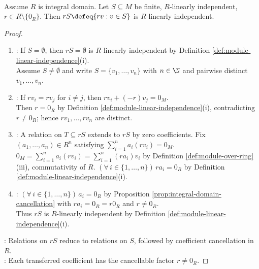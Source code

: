 \begin{proposition} \label{prop:integral-domain-scaling-preserves-independence} \\
Assume $R$ is integral domain. Let $S\subseteq M$ be finite, $R$-linearly independent,  $r\in R\setminus\{0_R\}$. Then $rS\defeq\{rv:v\in S\}$ is $R$-linearly independent.
\begin{proof}
\begin{enumerate}[label=(\roman*)]
\setlength{\itemsep}{0pt}
\item {}: If $S=\emptyset$, then $rS=\emptyset$ is $R$-linearly independent by Definition \ref{def:module-linear-independence}(i).\\
Assume $S\neq\emptyset$ and write $S=\{v_1,\ldots,v_n\}$ with $n\in\N$ and pairwise distinct $v_1,\ldots,v_n$.
\item {}: If $rv_i=rv_j$ for $i\neq j$, then $rv_i+(-r)v_j=0_M$.\\
Then $r=0_R$ by Definition \ref{def:module-linear-independence}(i), contradicting $r\neq0_R$; hence $rv_1,\ldots,rv_n$ are distinct.
\item {}: A relation on $T\subseteq rS$ extends to $rS$ by zero coefficients. Fix $(a_1,\ldots,a_n)\in R^n$ satisfying $\sum\limits_{i=1}^{n}a_i(rv_i)=0_M$.\\
$0_M=\sum\limits_{i=1}^{n}a_i(rv_i)=\sum\limits_{i=1}^{n}(ra_i)v_i$ by Definition \ref{def:module-over-ring}(iii), commutativity of $R$. $(\forall\,i\in\{1,\ldots,n\})\,ra_i=0_R$ by Definition \ref{def:module-linear-independence}(i).
\item {}: $(\forall\,i\in\{1,\ldots,n\})\,a_i=0_R$ by Proposition \ref{prop:integral-domain-cancellation} with $ra_i=0_R=r0_R$ and $r\neq0_R$.\\
Thus $rS$ is $R$-linearly independent by Definition \ref{def:module-linear-independence}(i).
\end{enumerate}
: Relations on $rS$ reduce to relations on $S$, followed by coefficient cancellation in $R$.\\
: Each transferred coefficient has the cancellable factor $r\neq0_R$.
\end{proof}
\end{proposition}
